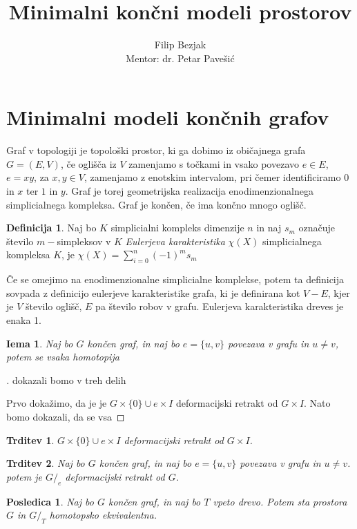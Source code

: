\documentclass[a4paper,12pt]{article}
\title{Minimalni končni modeli prostorov}
\author{Filip Bezjak \\ Mentor: dr. Petar Pavešić}
\theoremstyle{definition}
\newtheorem{definicija}{Definicija}
\theoremstyle{plain}
\theoremstyle{definition}
\theoremstyle{plain}
\newtheorem{trditev}{Trditev}
\theoremstyle{plain}
\newtheorem{posledica}{Posledica}
\theoremstyle{plain}
\theoremstyle{plain}
\newtheorem{lema}{Iema}
\newenvironment{dokaz}{\begin{proof}[\bfseries\upshape\proofname]}{\end{proof}}
\begin{document}
\section{Minimalni modeli končnih grafov}

Graf v topologiji je topološki prostor, ki ga dobimo iz običajnega grafa 
$G=(E,V)$, če oglišča iz $V$ zamenjamo s točkami in vsako povezavo $e\in 
E$, $e=xy$, za $x,y\in V$, zamenjamo z enotskim intervalom, pri čemer 
identificiramo $0$ in $x$ ter $1$ in $y$.
Graf je torej geometrijska realizacija enodimenzionalnega simplicialnega 
kompleksa. Graf je končen, če ima končno mnogo oglišč.


\begin{definicija}
    Naj bo $K$ simplicialni kompleks dimenzije $n$ in naj $s_m$ označuje število $m-$simpleksov v $K$
    \textit{Eulerjeva karakteristika} $\chi(X)$ simplicialnega kompleksa $K$, je  $\chi(X)=\sum_{i=0}^n (-1)^m s_m$
\end{definicija}

Če se omejimo na enodimenzionalne simplicialne komplekse, potem ta definicija sovpada z definicijo eulerjeve karakteristike grafa, ki je definirana kot $V-E$, kjer je $V$ število oglišč, $E$ pa število robov v grafu. Eulerjeva karakteristika dreves je enaka 1.

\begin{lema}
    Naj bo $G$ končen graf, in naj bo $e=\{u,v\}$ povezava v grafu in $u\neq v$, potem se vsaka homotopija 
\end{lema}

\begin{dokaz}
    dokazali bomo v treh delih 

    Prvo dokažimo, da je je $G\times \{0\}\cup e\times I$ deformacijski retrakt od $G\times I$. Nato bomo dokazali, da se vsa
\end{dokaz}
\begin{trditev}
    $G\times \{0\}\cup e\times I$ deformacijski retrakt od $G\times I$.
\end{trditev}


\begin{trditev}
    Naj bo $G$ končen graf, in naj bo $e=\{u,v\}$ povezava v grafu in $u\neq v$. potem je $G/_e$ deformacijski retrakt od $G$.
\end{trditev}

\begin{posledica}
    Naj bo $G$ končen graf, in naj bo $T$ vpeto drevo. Potem sta prostora $G$ in $G/_T$ homotopsko ekvivalentna.
\end{posledica}
\end{document}
